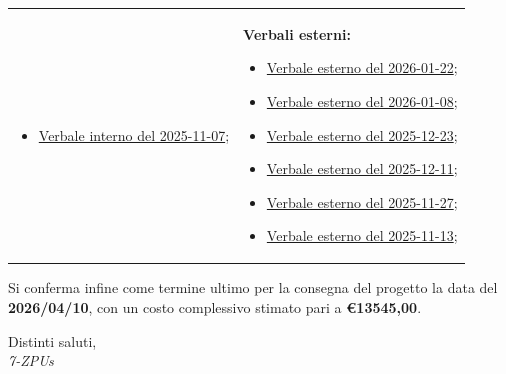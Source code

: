 \documentclass[a4paper,12pt]{article}
\begin{document}
\begin{tabular}{p{} p{}}
\begin{itemize}[leftmargin=*]
    \item \href{https://7-zpus.github.io/Docs/assets/2_RTB/DocumentiInterni/Verbali/2025-11-07-VerbaleInterno.pdf}{Verbale interno del 2025-11-07};
\end{itemize}
&
\textbf{Verbali esterni:}
\begin{itemize}[leftmargin=*]
    \item \href{https://7-zpus.github.io/Docs/assets/2_RTB/DocumentiEsterni/Verbali/2026-01-22-VerbaleEsterno.pdf}{Verbale esterno del 2026-01-22};
    \item \href{https://7-zpus.github.io/Docs/assets/2_RTB/DocumentiEsterni/Verbali/2026-01-08-VerbaleEsterno.pdf}{Verbale esterno del 2026-01-08};
    \item \href{https://7-zpus.github.io/Docs/assets/2_RTB/DocumentiEsterni/Verbali/2025-12-23-VerbaleEsterno.pdf}{Verbale esterno del 2025-12-23};
    \item \href{https://7-zpus.github.io/Docs/assets/2_RTB/DocumentiEsterni/Verbali/2025-12-11-VerbaleEsterno.pdf}{Verbale esterno del 2025-12-11};
    \item \href{https://7-zpus.github.io/Docs/assets/2_RTB/DocumentiEsterni/Verbali/2025-11-27-VerbaleEsterno.pdf}{Verbale esterno del 2025-11-27};
    \item \href{https://7-zpus.github.io/Docs/assets/2_RTB/DocumentiEsterni/Verbali/2025-11-13-VerbaleEsterno.pdf}{Verbale esterno del 2025-11-13};
\end{itemize}

\end{tabular}

\vspace{1cm}

Si conferma infine come termine ultimo per la consegna del progetto la data del
\textbf{2026/04/10}, con un costo complessivo stimato pari a \textbf{€13545,00}.

\vspace{0.8cm}

Distinti saluti,\\
\vspace{0.3cm}
\textit{7-ZPUs}
\end{document}
